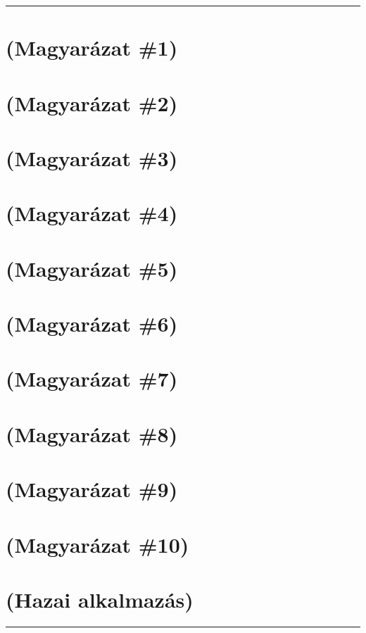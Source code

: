 \documentclass[]{report}
\newenvironment{expl}[0]%
  {\rule{\textwidth}{.2pt}\footnotesize}%
  {\rule{\textwidth}{.2pt}\normalsize}
\newenvironment{hunexpl}[0]%
  {\footnotesize\itshape}%
  {\normalsize}
\begin{document}
\begin{expl}

\section*{(Magyarázat \#1)}


\section*{(Magyarázat \#2)}


\section*{(Magyarázat \#3)}


\section*{(Magyarázat \#4)}


\section*{(Magyarázat \#5)}


\section*{(Magyarázat \#6)}


\section*{(Magyarázat \#7)}


\section*{(Magyarázat \#8)}


\section*{(Magyarázat \#9)}


\section*{(Magyarázat \#10)}


\begin{hunexpl}
\section*{(Hazai alkalmazás)}

\end{hunexpl}

\end{expl}
\end{document}

